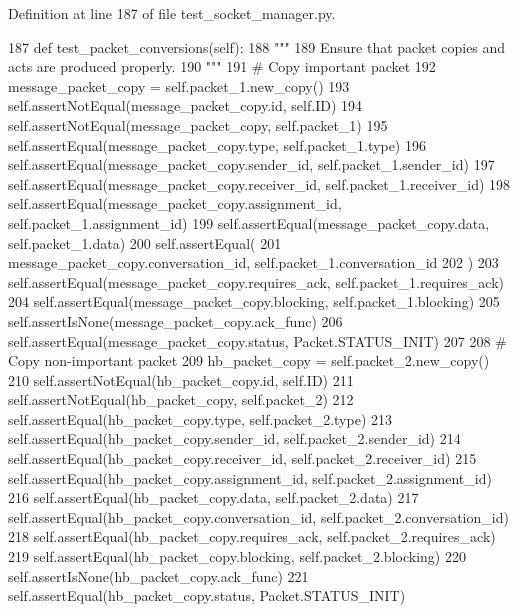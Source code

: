 Definition at line 187 of file test\+\_\+socket\+\_\+manager.\+py.


\begin{DoxyCode}
187     \textcolor{keyword}{def }test\_packet\_conversions(self):
188         \textcolor{stringliteral}{"""}
189 \textcolor{stringliteral}{        Ensure that packet copies and acts are produced properly.}
190 \textcolor{stringliteral}{        """}
191         \textcolor{comment}{# Copy important packet}
192         message\_packet\_copy = self.packet\_1.new\_copy()
193         self.assertNotEqual(message\_packet\_copy.id, self.ID)
194         self.assertNotEqual(message\_packet\_copy, self.packet\_1)
195         self.assertEqual(message\_packet\_copy.type, self.packet\_1.type)
196         self.assertEqual(message\_packet\_copy.sender\_id, self.packet\_1.sender\_id)
197         self.assertEqual(message\_packet\_copy.receiver\_id, self.packet\_1.receiver\_id)
198         self.assertEqual(message\_packet\_copy.assignment\_id, self.packet\_1.assignment\_id)
199         self.assertEqual(message\_packet\_copy.data, self.packet\_1.data)
200         self.assertEqual(
201             message\_packet\_copy.conversation\_id, self.packet\_1.conversation\_id
202         )
203         self.assertEqual(message\_packet\_copy.requires\_ack, self.packet\_1.requires\_ack)
204         self.assertEqual(message\_packet\_copy.blocking, self.packet\_1.blocking)
205         self.assertIsNone(message\_packet\_copy.ack\_func)
206         self.assertEqual(message\_packet\_copy.status, Packet.STATUS\_INIT)
207 
208         \textcolor{comment}{# Copy non-important packet}
209         hb\_packet\_copy = self.packet\_2.new\_copy()
210         self.assertNotEqual(hb\_packet\_copy.id, self.ID)
211         self.assertNotEqual(hb\_packet\_copy, self.packet\_2)
212         self.assertEqual(hb\_packet\_copy.type, self.packet\_2.type)
213         self.assertEqual(hb\_packet\_copy.sender\_id, self.packet\_2.sender\_id)
214         self.assertEqual(hb\_packet\_copy.receiver\_id, self.packet\_2.receiver\_id)
215         self.assertEqual(hb\_packet\_copy.assignment\_id, self.packet\_2.assignment\_id)
216         self.assertEqual(hb\_packet\_copy.data, self.packet\_2.data)
217         self.assertEqual(hb\_packet\_copy.conversation\_id, self.packet\_2.conversation\_id)
218         self.assertEqual(hb\_packet\_copy.requires\_ack, self.packet\_2.requires\_ack)
219         self.assertEqual(hb\_packet\_copy.blocking, self.packet\_2.blocking)
220         self.assertIsNone(hb\_packet\_copy.ack\_func)
221         self.assertEqual(hb\_packet\_copy.status, Packet.STATUS\_INIT)

\end{DoxyCode}

